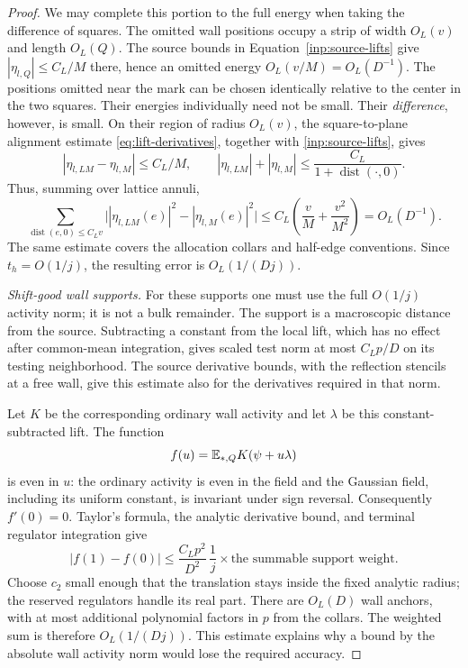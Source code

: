 \begin{proof}
We may complete this portion to the full energy when taking the
difference of squares.  The omitted wall positions occupy a strip of
width $O_L(v)$ and length $O_L(Q)$.  The source bounds in
Equation~\eqref{inp:source-lifts} give $|\eta_{l,Q}|\leq C_L/M$ there,
hence an omitted energy $O_L(v/M)=O_L(D^{-1})$.  The positions omitted
near the mark can be chosen identically relative to the center in the
two squares.  Their energies individually need not be small.  Their
\emph{difference}, however, is small.  On their region of radius
$O_L(v)$, the square-to-plane alignment estimate
\eqref{eq:lift-derivatives}, together with
\eqref{inp:source-lifts}, gives
\[
 |\eta_{l,LM}-\eta_{l,M}|\leq C_L/M,
 \qquad
 |\eta_{l,LM}|+|\eta_{l,M}|
       \leq \frac{C_L}{1+\operatorname{dist}(\cdot,0)}.
\]
Thus, summing over lattice annuli,
\[
 \sum_{\operatorname{dist}(e,0)\leq C_Lv}
 \bigl||\eta_{l,LM}(e)|^2-|\eta_{l,M}(e)|^2\bigr|
 \leq C_L\left(\frac vM+\frac{v^2}{M^2}\right)
 =O_L(D^{-1}).
\]
The same estimate covers the allocation collars and half-edge
conventions.  Since $t_h=O(1/j)$, the resulting error is $O_L(1/(Dj))$.

\emph{Shift-good wall supports.}
For these supports one must use the full $O(1/j)$ activity norm; it is
not a bulk remainder.  The support is a macroscopic distance from the
source.  Subtracting a constant from the local lift, which has no
effect after common-mean integration, gives scaled test norm at most
$C_Lp/D$ on its testing neighborhood.  The source derivative bounds,
with the reflection stencils at a free wall, give this estimate also
for the derivatives required in that norm.

Let $K$ be the corresponding ordinary wall activity and let
$\lambda$ be this constant-subtracted lift.  The function
\[
                    f(u)=\mathbb E_{*,Q}K(\psi+u\lambda)
\]
is even in $u$: the ordinary activity is even in the field and the
Gaussian field, including its uniform constant, is invariant under
sign reversal.  Consequently $f'(0)=0$.  Taylor's formula, the
analytic derivative bound, and terminal regulator integration give
\[
 |f(1)-f(0)|
 \leq \frac{C_Lp^2}{D^2}\,\frac1j
       \times\text{the summable support weight}.
\]
Choose $c_2$ small enough that the translation stays inside the fixed
analytic radius; the reserved regulators handle its real part.
There are $O_L(D)$ wall anchors, with at most additional polynomial
factors in $p$ from the collars.  The weighted sum is therefore
$O_L(1/(Dj))$.  This estimate explains why a bound by the absolute
wall activity norm would lose the required accuracy.


\end{proof}
